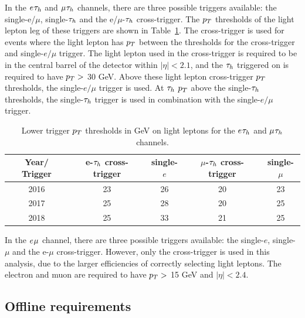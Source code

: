 In the $e_{}\tau_{h}$ and $\mu_{}\tau_{h}$ channels, there are three possible triggers available: the single-e/$\mu$, single-$\tau_{h}$ and the e/$\mu$-$\tau_{h}$ cross-trigger.
The $\pT$ thresholds of the light lepton leg of these triggers are shown in Table~\ref{tab:trig_thresholds}.
The cross-trigger is used for events where the light lepton has $\pT$ between the thresholds for the cross-trigger and single-$e/\mu$ trigger.
The light lepton used in the cross-trigger is required to be in the central barrel of the detector within $|\eta| < 2.1$, and the $\tau_{h}$ triggered on is required to have $p_{T} >$ 30 GeV.
Above these light lepton cross-trigger $\pT$ thresholds, the single-$e/\mu$ trigger is used.
At $\tau_{h}$ $\pT$ above the single-$\tau_{h}$ thresholds, the single-$\tau_{h}$ trigger is used in combination with the single-$e/\mu$ trigger. \\

\begin{table}[t]
  \centering
  \begin{tabular}{|c||c|c|c|c|}
    \hline
    Year/ Trigger   & e-$\tau_{h}$ cross-trigger & single-$e$ & $\mu$-$\tau_{h}$ cross-trigger & single-$\mu$ \\
    \hline
    \hline
    2016 & 23                    & 26         & 20                     & 23           \\
    2017 & 25                    & 28         & 20                     & 25           \\
    2018 & 25                    & 33         & 21                     & 25           \\
    \hline        
  \end{tabular}
  \caption[Trigger $\pT$ thresholds of light lepton triggers.]{Lower trigger $\pT$ thresholds in GeV on light leptons for the $e_{}\tau_{h}$ and $\mu_{}\tau_{h}$ channels.}
  \label{tab:trig_thresholds}  
\end{table}

In the $e_{}\mu_{}$ channel, there are three possible triggers available: the single-$e$, single-$\mu$ and the e-$\mu$ cross-trigger.
However, only the cross-trigger is used in this analysis, due to the larger efficiencies of correctly selecting light leptons.
The electron and muon are required to have $p_{T} >$ 15 GeV and $|\eta| < 2.4$.

\subsection{Offline requirements}

